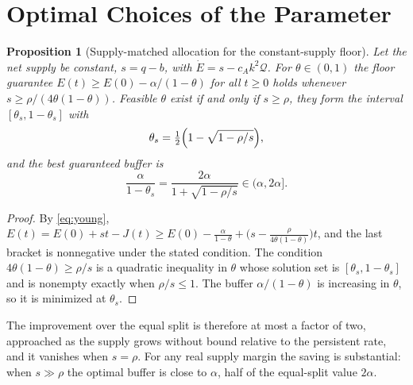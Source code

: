 \documentclass[11pt,notitlepage]{report}
\newtheorem{proposition}[theorem]{Proposition}
\theoremstyle{definition}
\theoremstyle{remark}
\begin{document}
\section{Optimal Choices of the Parameter}
\begin{proposition}[Supply-matched allocation for the constant-supply floor]\label{prop:supplymatched}
Let the net supply be constant, $s=q-b$, with $\dot E=s-c_Ak^2\mathcal Q$. For $\theta\in(0,1)$ the floor guarantee $E(t)\ge E(0)-\alpha/(1-\theta)$ for all $t\ge0$ holds whenever $s\ge\rho/(4\theta(1-\theta))$. Feasible $\theta$ exist if and only if $s\ge\rho$, they form the interval $[\theta_s,1-\theta_s]$ with
\[
\theta_s=\tfrac12\Bigl(1-\sqrt{1-\rho/s}\Bigr),
\]
and the best guaranteed buffer is
\[
\frac{\alpha}{1-\theta_s}=\frac{2\alpha}{1+\sqrt{1-\rho/s}}\in(\alpha,2\alpha].
\]
\end{proposition}
\begin{proof}
By \eqref{eq:young}, $E(t)=E(0)+st-J(t)\ge E(0)-\tfrac{\alpha}{1-\theta}+\bigl(s-\tfrac{\rho}{4\theta(1-\theta)}\bigr)t$, and the last bracket is nonnegative under the stated condition. The condition $4\theta(1-\theta)\ge\rho/s$ is a quadratic inequality in $\theta$ whose solution set is $[\theta_s,1-\theta_s]$ and is nonempty exactly when $\rho/s\le1$. The buffer $\alpha/(1-\theta)$ is increasing in $\theta$, so it is minimized at $\theta_s$.
\end{proof}
The improvement over the equal split is therefore at most a factor of two, approached as the supply grows without bound relative to the persistent rate, and it vanishes when $s=\rho$. For any real supply margin the saving is substantial: when $s\gg\rho$ the optimal buffer is close to $\alpha$, half of the equal-split value $2\alpha$.
\end{document}
